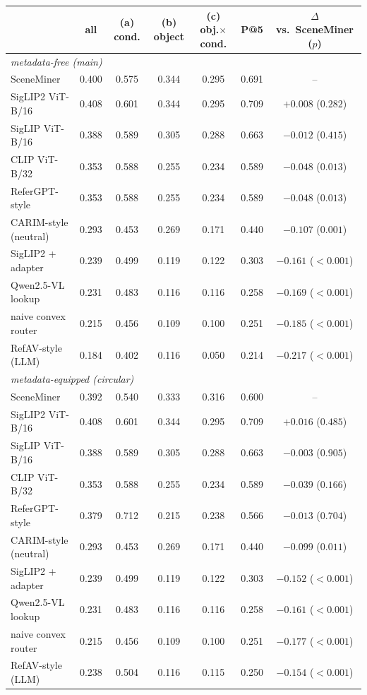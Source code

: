 \begin{tabular}{lcccccc}
\toprule
 & all & (a) cond. & (b) object & (c) obj.$\times$cond. & P@5 & $\Delta$ vs.\ SceneMiner ($p$)\\
\midrule
\multicolumn{7}{l}{\emph{metadata-free (main)}}\\
SceneMiner & 0.400 & 0.575 & 0.344 & 0.295 & 0.691 & --\\
SigLIP2 ViT-B/16 & 0.408 & 0.601 & 0.344 & 0.295 & 0.709 & $+0.008$ ($0.282$)\\
SigLIP ViT-B/16 & 0.388 & 0.589 & 0.305 & 0.288 & 0.663 & $-0.012$ ($0.415$)\\
CLIP ViT-B/32 & 0.353 & 0.588 & 0.255 & 0.234 & 0.589 & $-0.048$ ($0.013$)\\
ReferGPT-style & 0.353 & 0.588 & 0.255 & 0.234 & 0.589 & $-0.048$ ($0.013$)\\
CARIM-style (neutral) & 0.293 & 0.453 & 0.269 & 0.171 & 0.440 & $-0.107$ ($0.001$)\\
SigLIP2 + adapter & 0.239 & 0.499 & 0.119 & 0.122 & 0.303 & $-0.161$ ($<0.001$)\\
Qwen2.5-VL lookup & 0.231 & 0.483 & 0.116 & 0.116 & 0.258 & $-0.169$ ($<0.001$)\\
naive convex router & 0.215 & 0.456 & 0.109 & 0.100 & 0.251 & $-0.185$ ($<0.001$)\\
RefAV-style (LLM) & 0.184 & 0.402 & 0.116 & 0.050 & 0.214 & $-0.217$ ($<0.001$)\\
\midrule
\multicolumn{7}{l}{\emph{metadata-equipped (circular)}}\\
SceneMiner & 0.392 & 0.540 & 0.333 & 0.316 & 0.600 & --\\
SigLIP2 ViT-B/16 & 0.408 & 0.601 & 0.344 & 0.295 & 0.709 & $+0.016$ ($0.485$)\\
SigLIP ViT-B/16 & 0.388 & 0.589 & 0.305 & 0.288 & 0.663 & $-0.003$ ($0.905$)\\
CLIP ViT-B/32 & 0.353 & 0.588 & 0.255 & 0.234 & 0.589 & $-0.039$ ($0.166$)\\
ReferGPT-style & 0.379 & 0.712 & 0.215 & 0.238 & 0.566 & $-0.013$ ($0.704$)\\
CARIM-style (neutral) & 0.293 & 0.453 & 0.269 & 0.171 & 0.440 & $-0.099$ ($0.011$)\\
SigLIP2 + adapter & 0.239 & 0.499 & 0.119 & 0.122 & 0.303 & $-0.152$ ($<0.001$)\\
Qwen2.5-VL lookup & 0.231 & 0.483 & 0.116 & 0.116 & 0.258 & $-0.161$ ($<0.001$)\\
naive convex router & 0.215 & 0.456 & 0.109 & 0.100 & 0.251 & $-0.177$ ($<0.001$)\\
RefAV-style (LLM) & 0.238 & 0.504 & 0.116 & 0.115 & 0.250 & $-0.154$ ($<0.001$)\\
\bottomrule
\end{tabular}

